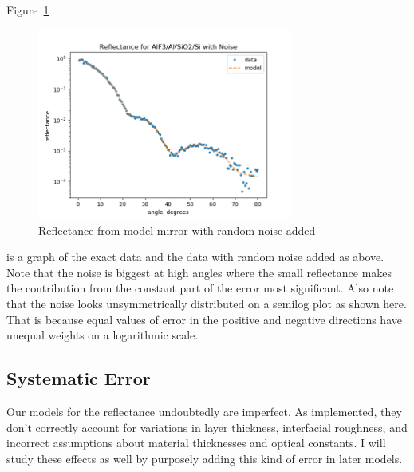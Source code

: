 \documentclass[english]{scrartcl}
\begin{document}
Figure~\ref{fig:noise}
\begin{figure}[htb]
  \begin{center}
    \includegraphics[width=0.75\textwidth]{images/noise}
  \end{center}
  \caption{\label{fig:noise}Reflectance from model mirror with random
  noise added}
\end{figure}
is a graph of the exact data and the data with
random noise added as above. Note that the noise is biggest at high
angles where the small reflectance makes the contribution from the
constant part of the error most significant. Also note that the noise
looks unsymmetrically distributed on a semilog plot as shown here.
That is because equal values of error in the positive and negative
directions have unequal weights on a logarithmic scale.

\subsection{Systematic Error}\label{sec:syserr}
Our models for the reflectance undoubtedly are imperfect. As implemented,
they don't correctly account for variations in layer thickness, interfacial
roughness, and incorrect assumptions about material thicknesses and
optical constants. I will study these effects as well by purposely adding
this kind of error in later models.
\end{document}
